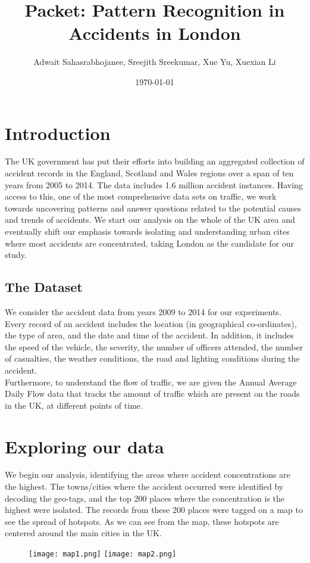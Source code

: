 \documentclass{neu_handout}
\title{Packet: Pattern Recognition in Accidents in London}
\author{Adwait Sahasrabhojanee, Sreejith Sreekumar, Xue Yu, Xuexian Li}
\date{\today}
\begin{document}
\section{Introduction}
The UK government has put their efforts into building an aggregated collection of accident records in the England, Scotland and Wales regions
over a span of ten years from 2005 to 2014. The data includes 1.6 million accident instances. Having access to this, one of the most comprehensive data sets on traffic, we work towards
uncovering patterns and answer questions related to the potential causes and trends of accidents. We start our analysis on the whole of the UK area and eventually shift our emphasis towards
isolating and understanding urban cites where most accidents are concentrated, taking London as the candidate for our study.

\subsection{The Dataset}
We consider the accident data from years 2009 to 2014 for our experiments. Every record of an accident includes the location (in geographical co-ordinates), the type of area, and the date and time of the accident. In addition, it includes the speed of the vehicle, the severity, the number of officers attended, the number of casualties, the weather conditions, the road and lighting conditions during the accident. \\

Furthermore, to understand the flow of traffic, we are given the Annual Average Daily Flow data that tracks the amount of traffic which are present on the roads in the UK, at different points of time. \\

\section{Exploring our data}
We begin our analysis, identifying the areas where accident concentrations are the highest. The towns/cities where the accident occurred were identified by decoding the geo-tags, and the top 200 places where the concentration is the highest were isolated. The records from these 200 places were tagged on a map to see the spread of hotspots. As we can see from the map, these hotspots are centered around the main cities in the UK.

\begin{figure}[!htb]
  \texttt{[image: map1.png]}
  \endminipage\hfill
{}
  \texttt{[image: map2.png]}
\endminipage
\end{figure}
\end{document}
